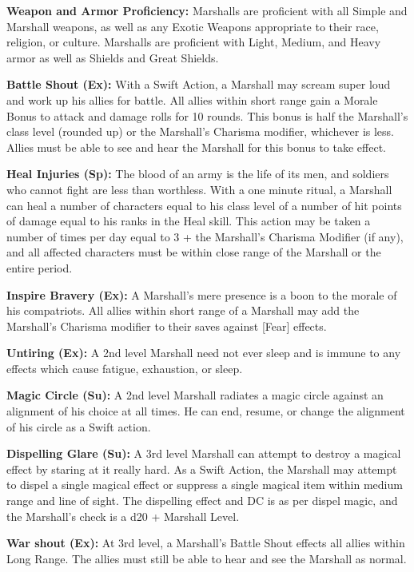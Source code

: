 \classfeatures

\textbf{Weapon and Armor Proficiency:} Marshalls are proficient with all Simple and Marshall weapons, as well as any Exotic Weapons appropriate to their race, religion, or culture. Marshalls are proficient with Light, Medium, and Heavy armor as well as Shields and Great Shields.

\textbf{Battle Shout (Ex):} With a Swift Action, a Marshall may scream super loud and work up his allies for battle. All allies within short range gain a Morale Bonus to attack and damage rolls for 10 rounds. This bonus is half the Marshall's class level (rounded up) or the Marshall's Charisma modifier, whichever is less. Allies must be able to see and hear the Marshall for this bonus to take effect.

\textbf{Heal Injuries (Sp):} The blood of an army is the life of its men, and soldiers who cannot fight are less than worthless. With a one minute ritual, a Marshall can heal a number of characters equal to his class level of a number of hit points of damage equal to his ranks in the Heal skill. This action may be taken a number of times per day equal to 3 + the Marshall's Charisma Modifier (if any), and all affected characters must be within close range of the Marshall or the entire period.

\textbf{Inspire Bravery (Ex):} A Marshall's mere presence is a boon to the morale of his compatriots. All allies within short range of a Marshall may add the Marshall's Charisma modifier to their saves against [Fear] effects.

\textbf{Untiring (Ex):} A 2nd level Marshall need not ever sleep and is immune to any effects which cause fatigue, exhaustion, or sleep.

\textbf{Magic Circle (Su):} A 2nd level Marshall radiates a magic circle against an alignment of his choice at all times. He can end, resume, or change the alignment of his circle as a Swift action.

\textbf{Dispelling Glare (Su):} A 3rd level Marshall can attempt to destroy a magical effect by staring at it really hard. As a Swift Action, the Marshall may attempt to dispel a single magical effect or suppress a single magical item within medium range and line of sight. The dispelling effect and DC is as per dispel magic, and the Marshall's check is a d20 + Marshall Level.

\textbf{War shout (Ex):} At 3rd level, a Marshall's Battle Shout effects all allies within Long Range. The allies must still be able to hear and see the Marshall as normal.

